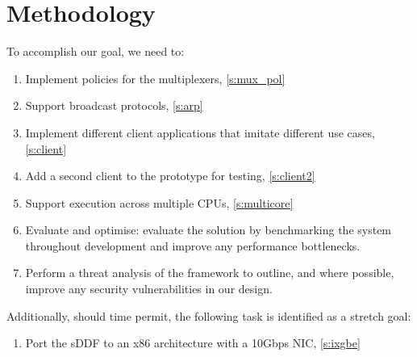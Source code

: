 \section{Methodology}
To accomplish our goal, we need to:
\begin{enumerate}
    \item Implement policies for the multiplexers, \autoref{s:mux_pol}
    \item Support broadcast protocols, \autoref{s:arp}
    \item Implement different client applications that imitate different use cases, \autoref{s:client}
    \item Add a second client to the prototype for testing, \autoref{s:client2}
    \item Support execution across multiple CPUs, \autoref{s:multicore}
    \item Evaluate and optimise: evaluate the solution by benchmarking the system throughout development 
    and improve any performance bottlenecks.
    \item Perform a threat analysis of the framework to outline, and where possible, improve any security vulnerabilities in our design. 
\end{enumerate}

Additionally, should time permit, the following task is identified as a stretch goal:
\begin{enumerate}
    \item Port the sDDF to an x86 architecture with a 10Gbps NIC, \autoref{s:ixgbe}
\end{enumerate}

